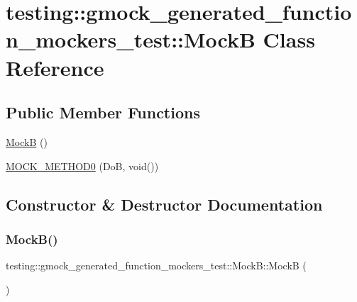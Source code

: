 \hypertarget{classtesting_1_1gmock__generated__function__mockers__test_1_1_mock_b}{}\section{testing\+:\+:gmock\+\_\+generated\+\_\+function\+\_\+mockers\+\_\+test\+:\+:MockB Class Reference}
\label{classtesting_1_1gmock__generated__function__mockers__test_1_1_mock_b}
\subsection*{Public Member Functions}
\begin{DoxyCompactItemize}
\item 
\hyperlink{classtesting_1_1gmock__generated__function__mockers__test_1_1_mock_b_a74072ea75eb47e4e91e40151396014a1}{MockB} ()
\item 
\hyperlink{classtesting_1_1gmock__generated__function__mockers__test_1_1_mock_b_af0a5dcd462fc478e5e7a1ef503aafb05}{M\+O\+C\+K\+\_\+\+M\+E\+T\+H\+O\+D0} (DoB, void())
\end{DoxyCompactItemize}


\subsection{Constructor \& Destructor Documentation}
\mbox{\label{classtesting_1_1gmock__generated__function__mockers__test_1_1_mock_b_a74072ea75eb47e4e91e40151396014a1}} 
\subsubsection{\texorpdfstring{Mock\+B()}{MockB()}}
{\footnotesize\ttfamily testing\+::gmock\+\_\+generated\+\_\+function\+\_\+mockers\+\_\+test\+::\+Mock\+B\+::\+MockB (\begin{DoxyParamCaption}{ }\end{DoxyParamCaption})\hspace{0.3cm}{\ttfamily [inline]}}



